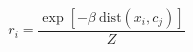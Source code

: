 \documentclass[10pt,a4paper]{article}
\author{J. T. Monroe}
\begin{document}
	\[
	r_i = \frac{\exp\left[-\beta ~\mathrm{dist}(x_i, c_j)\right]}{Z}
	\]
\end{document}
